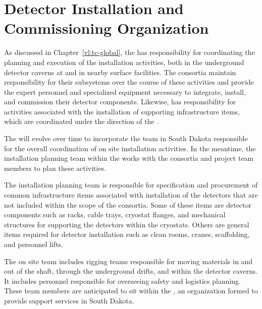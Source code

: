 \chapter{Detector Installation and Commissioning Organization}
\label{ch:tc-jpo}


As discussed in Chapter~\ref{vl:tc-global}, the  has
responsibility for coordinating the planning and execution of 
the  installation activities, both 
in the underground detector caverns at  and in 
nearby surface facilities.  The  consortia maintain 
responsibility for their subsystems over the course of these 
activities and provide the expert personnel and specialized 
equipment necessary to integrate, install, and commission their 
detector components.  Likewise,  has responsibility 
for activities associated with the installation 
of supporting infrastructure items, which are coordinated under 
the direction of the .       

The   will evolve over 
time to incorporate the team in South Dakota responsible for the 
overall coordination of on site installation activities.  In the 
meantime, the installation planning team within the  works with 
the  consortia and  project team members 
to plan these activities.  

The  installation planning team is responsible for specification 
and procurement of common infrastructure items associated with 
installation of the detectors that are not included within 
the scope of the  consortia.  Some of these items 
are detector components such as racks, cable trays, cryostat flanges, 
and mechanical structures for supporting the detectors within 
the cryostats.  Others are general items required for detector 
installation such as clean rooms, cranes, scaffolding, and 
personnel lifts.

The on site  team includes rigging teams responsible for moving 
materials in and out of the shaft, through the underground drifts, 
and within the detector caverns.  It includes personnel responsible 
for overseeing safety and logistics planning.  These team members 
are anticipated to sit within the , an organization 
formed to provide  support services in South Dakota.    

